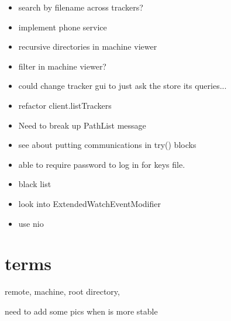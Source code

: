 \documentclass{article}
\begin{document}
\begin{itemize}
\item search by filename across trackers?
\item implement phone service
\item recursive directories in machine viewer
\item filter in machine viewer?
\item could change tracker gui to just ask the store its queries...
\item refactor client.listTrackers
\item Need to break up PathList message
\item see about putting communications in try() {} blocks
\item able to require password to log in for keys file.
\item black list
\item look into ExtendedWatchEventModifier
\item use nio
\end{itemize}


\section{terms}
remote, machine, root directory, 

need to add some pics when is more stable
\end{document}
